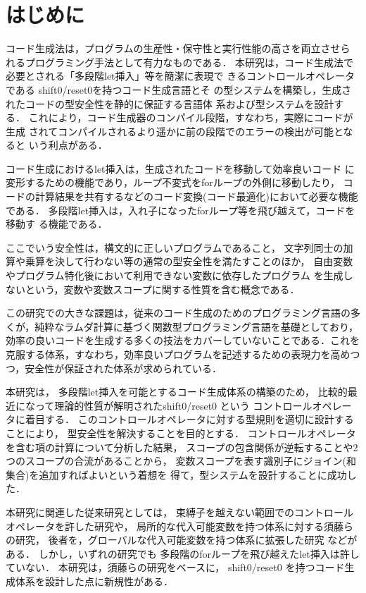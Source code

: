 \chapter{はじめに}
コード生成法は，プログラムの生産性・保守性と実行性能の高さを両立させら
れるプログラミング手法として有力なものである．
本研究は，コード生成法で必要とされる「多段階let挿入」等を簡潔に表現で
きるコントロールオペレータである shift0/reset0を持つコード生成言語とそ
の型システムを構築し，生成されたコードの型安全性を静的に保証する言語体
系および型システムを設計する．
これにより，コード生成器のコンパイル段階，すなわち，実際にコードが生成
されてコンパイルされるより遥かに前の段階でのエラーの検出が可能となると
いう利点がある．

コード生成におけるlet挿入は，生成されたコードを移動して効率良いコード
に変形するための機能であり，ループ不変式をforループの外側に移動したり，
コードの計算結果を共有するなどのコード変換(コード最適化)において必要な機能である．
多段階let挿入は，入れ子になったforループ等を飛び越えて，コードを移動す
る機能である．

ここでいう安全性は，構文的に正しいプログラムであること，
文字列同士の加算や乗算を決して行わない等の通常の型安全性を満たすことのほか，
自由変数やプログラム特化後において利用できない変数に依存したプログラム
を生成しないという，変数や変数スコープに関する性質を含む概念である．

この研究での大きな課題は，従来のコード生成のためのプログラミング言語の多くが，純粋なラムダ計算に基づく関数型プログラミング言語を基礎としており，効率の良いコードを生成する多くの技法をカバーしていないことである．これを克服する体系，すなわち，効率良いプログラムを記述するための表現力を高めつつ，安全性が保証された体系が求められている．

本研究は，
多段階let挿入を可能とするコード生成体系の構築のため，
比較的最近になって理論的性質が解明されたshift0/reset0\cite{Materzok2011} という
コントロールオペレータに着目する．
このコントロールオペレータに対する型規則を適切に設計することにより，
型安全性を解決することを目的とする．
コントロールオペレータを含む項の計算について分析した結果，
スコープの包含関係が逆転することや2つのスコープの合流があることから，
変数スコープを表す識別子にジョイン(和集合)を追加すればよいという着想を
得て，型システムを設計することに成功した．

本研究に関連した従来研究としては，
束縛子を越えない範囲でのコントロールオペレータを許した研究や，
局所的な代入可能変数を持つ体系に対する須藤らの研究\cite{Sudo2014}，
後者を，グローバルな代入可能変数を持つ体系に拡張した研究
\cite{Aplas2016}などがある．
しかし，いずれの研究でも 多段階のforループを飛び越えたlet挿入は許していない．
本研究は，須藤らの研究をベースに，
shift0/reset0 を持つコード生成体系を設計した点に新規性がある．

